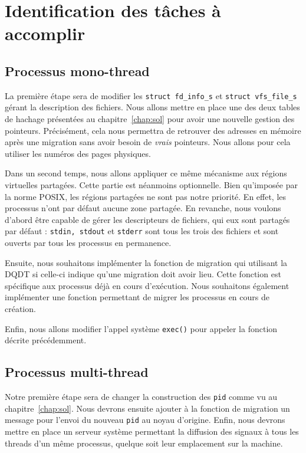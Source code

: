 \chapter{Identification des tâches à accomplir}
\label{chap:tasks}


  \section{Processus mono-thread}

    La première étape sera de modifier les \texttt{struct fd\_info\_s} et
    \texttt{struct vfs\_file\_s} gérant la description des fichiers. Nous allons
    mettre en place une des deux tables de hachage présentées au
    chapitre~\ref{chap:sol} pour avoir une nouvelle gestion des
    pointeurs. Précisément, cela nous permettra de retrouver des adresses en
    mémoire après une migration sans avoir besoin de \textit{vrais}
    pointeurs. Nous allons pour cela utiliser les numéros des pages physiques.

    Dans un second temps, nous allons appliquer ce même mécanisme aux régions
    virtuelles partagées. Cette partie est néanmoins optionnelle. Bien
    qu'imposée par la norme POSIX, les régions partagées ne sont pas notre
    priorité. En effet, les processus n'ont par défaut aucune zone partagée. En
    revanche, nous voulons d'abord être capable de gérer les descripteurs de
    fichiers, qui eux sont partagés par défaut : \texttt{stdin, stdout} et
    \texttt{stderr} sont tous les trois des fichiers et sont ouverts par tous
    les processus en permanence.

    Ensuite, nous souhaitons implémenter la fonction de migration qui utilisant
    la DQDT si celle-ci indique qu'une migration doit avoir lieu. Cette fonction
    est spécifique aux processus déjà en cours d'exécution. Nous souhaitons
    également implémenter une fonction permettant de migrer les processus en
    cours de création.
    
    Enfin, nous allons modifier l'appel système \texttt{exec()} pour appeler la
    fonction décrite précédemment.


  \section{Processus multi-thread}

    Notre première étape sera de changer la construction des \texttt{pid} comme
    vu au chapitre~\ref{chap:sol}. Nous devrons ensuite ajouter à la fonction de
    migration un message pour l'envoi du nouveau \texttt{pid} au noyau
    d'origine. Enfin, nous devrons mettre en place un serveur système permettant
    la diffusion des signaux à tous les threads d'un même processus, quelque
    soit leur emplacement sur la machine.

